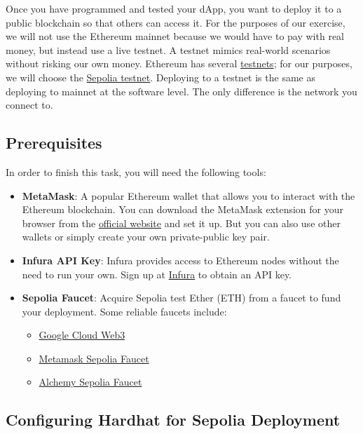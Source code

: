 \documentclass[12pt]{article}
\begin{document}
Once you have programmed and tested your dApp, you want to deploy it to a public blockchain so that others can access it. For the purposes of our exercise, we will not use the Ethereum mainnet because we would have to pay with real money, but instead use a live testnet. A testnet mimics real-world scenarios without risking our own money. Ethereum has several \href{https://ethereum.org/en/developers/docs/networks/#ethereum-testnets}{testnets}; for our purposes, we will choose the \href{https://sepolia.dev/}{Sepolia testnet}. Deploying to a testnet is the same as deploying to mainnet at the software level. The only difference is the network you connect to.

\subsection{Prerequisites}

In order to finish this task, you will need the following tools:

\begin{itemize}
    \item \textbf{MetaMask}: A popular Ethereum wallet that allows you to interact with the Ethereum blockchain. You can download the MetaMask extension for your browser from the \href{https://metamask.io/}{official website} and set it up. But you can also use other wallets or simply create your own private-public key pair.
    
    \item \textbf{Infura API Key}: Infura provides access to Ethereum nodes without the need to run your own. Sign up at \href{https://infura.io/}{Infura} to obtain an API key.
    
    \item \textbf{Sepolia Faucet}: Acquire Sepolia test Ether (ETH) from a faucet to fund your deployment. Some reliable faucets include:
    \begin{itemize}
        \item \href{https://cloud.google.com/application/web3/faucet/ethereum/sepolia}{Google Cloud Web3}
        \item \href{https://docs.metamask.io/developer-tools/faucet/}{Metamask Sepolia Faucet}
        \item \href{https://www.alchemy.com/faucets/ethereum-sepolia}{Alchemy Sepolia Faucet}
    \end{itemize}
\end{itemize}


\subsection{Configuring Hardhat for Sepolia Deployment}
\end{document}
